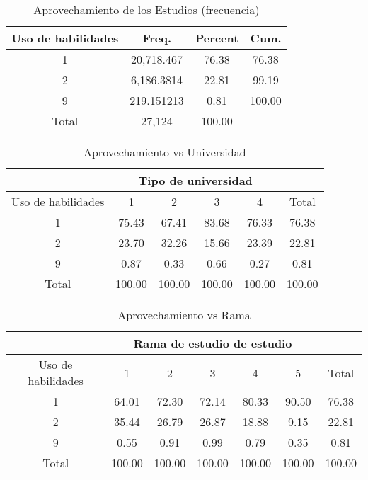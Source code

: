 \documentclass{article}
\begin{document}
\begin{table}[]
\centering
\caption{Aprovechamiento de los Estudios (frecuencia)}
\begin{tabular}{c|ccc} \hline \hline
Uso de habilidades       & Freq.  & Percent & Cum. \\ \hline
1 & 20,718.467 & 76.38  & 76.38         \\
2 & 6,186.3814 & 22.81  & 99.19         \\
9 & 219.151213 & 0.81   & 100.00        \\
Total         & 27,124 & 100.00       \\ \hline \hline
\end{tabular}
\end{table}

\begin{table}[]
\centering
\caption{Aprovechamiento vs Universidad}
\begin{tabular}{c|cccc|c} \hline \hline
                           & \multicolumn{4}{c|}{Tipo de universidad}                             &        \\ \hline
Uso de habilidades                    & 1                          & 2                          & 3                          & 4       & Total  \\ \hline
1                          & 75.43                      & 67.41                      & 83.68                      & 76.33   & 76.38  \\
2                          & 23.70                      & 32.26                      & 15.66                      & 23.39   & 22.81  \\
9      & 0.87   & 0.33   & 0.66   & 0.27    & 0.81   \\
Total  & 100.00 & 100.00 & 100.00 & 100.00  & 100.00 \\ \hline \hline
\end{tabular}
\end{table}

\begin{table}[]
\centering
\caption{Aprovechamiento vs Rama}
\begin{tabular}{c|ccccc|c} \hline \hline
                     & \multicolumn{5}{|c}{Rama de estudio de estudio}          &  \\\hline 
Uso de habilidades             & 1      & 2      & 3      & 4      & 5       & Total                \\ \hline
1                   & 64.01  & 72.30  & 72.14  & 80.33  & 90.50   & 76.38                \\
2                   & 35.44  & 26.79  & 26.87  & 18.88  & 9.15    & 22.81                \\
9                   & 0.55   & 0.91   & 0.99   & 0.79   & 0.35    & 0.81                 \\
Total               & 100.00 & 100.00 & 100.00 & 100.00 & 100.00  & 100.00              \\ \hline \hline
\end{tabular}
\end{table}
\end{document}
